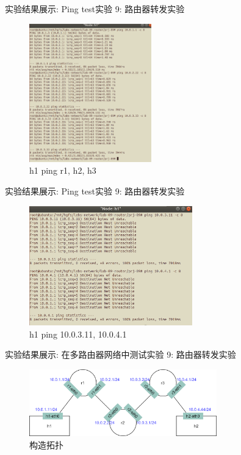 \documentclass{beamer}
\begin{document}
\begin{frame}{实验结果展示: Ping test}{实验 9: 路由器转发实验}
    \begin{figure}[h]
        \centering %
        \includegraphics[width=150pt]{../lab-09-router/readme.assets/test-01-01.png}
        \caption{h1 ping r1, h2, h3} %
    \end{figure}
\end{frame}
\begin{frame}{实验结果展示: Ping test}{实验 9: 路由器转发实验}
    \begin{figure}[h]
        \centering %
        \includegraphics[width=200pt]{../lab-09-router/readme.assets/test-01-02.png}
        \caption{h1 ping 10.0.3.11, 10.0.4.1} %
    \end{figure}
\end{frame}
\begin{frame}{实验结果展示: 在多路由器网络中测试}{实验 9: 路由器转发实验}
    \begin{figure}[h]
        \centering %
        \includegraphics[width=230pt]{../lab-09-router/readme.assets/trace-path.png}
        \caption{构造拓扑} %
    \end{figure}
\end{frame}
\end{document}
